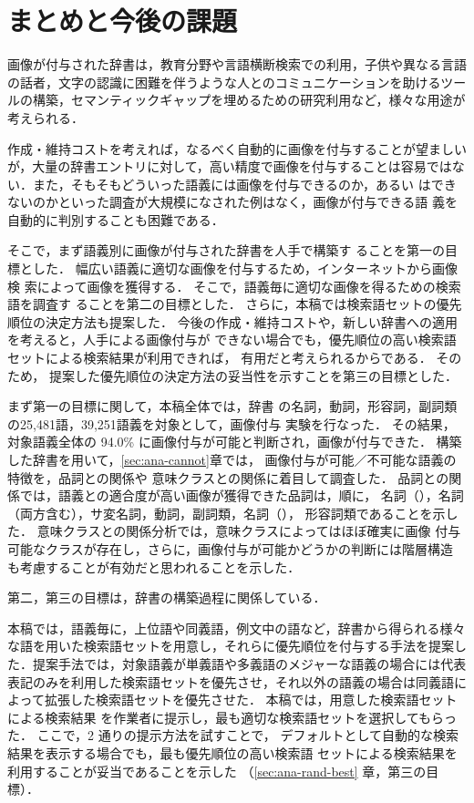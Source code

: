 \documentclass[japanese]{jnlp_1.4}
\newcommand{\izs}[1]{}
\newcommand{\lxd}{}
\begin{document}
\section{まとめと今後の課題}
\label{sec:conclusion}


画像が付与された辞書は，教育分野や言語横断検索での利用，子供や異なる言語
の話者，文字の認識に困難を伴うような人とのコミュニケーションを助けるツー
ルの構築，セマンティックギャップを埋めるための研究利用など，様々な用途が
考えられる．

作成・維持コストを考えれば，なるべく自動的に画像を付与することが望ましい
が，大量の辞書エントリに対して，高い精度で画像を付与することは容易ではな
い．また，そもそもどういった語義には画像を付与できるのか，あるい
はできないのかといった調査が大規模になされた例はなく，画像が付与できる語
義を自動的に判別することも困難である．


そこで，まず語義別に画像が付与された辞書を人手で構築す
ることを第一の目標とした．
幅広い語義に適切な画像を付与するため，インターネットから画像検
索によって画像を獲得する．
そこで，語義毎に適切な画像を得るための検索語を調査す
ることを第二の目標とした．
さらに，本稿では検索語セットの優先順位の決定方法も提案した．
今後の作成・維持コストや，新しい辞書への適用を考えると，人手による画像付与が
できない場合でも，優先順位の高い検索語セットによる検索結果が利用できれば，
有用だと考えられるからである．
そのため，
提案した優先順位の決定方法の妥当性を示すことを第三の目標とした．


まず第一の目標に関して，本稿全体では，辞書\lxd{}
の名詞，動詞，形容詞，副詞類の25,481語，39,251語義を対象として，画像付与
実験を行なった．
その結果，対象語義全体の 94.0\% に画像付与が可能と判断され，画像が付与できた．
構築した辞書を用いて，\ref{sec:ana-cannot}章では，
画像付与が可能／不可能な語義の特徴を，品詞との関係や
意味クラスとの関係に着目して調査した．
品詞との関係では，語義との適合度が高い画像が獲得できた品詞は，順に，
名詞（\izs{2:具体}），名詞（両方含む），サ変名詞，動詞，副詞類，名詞（\izs{1000:抽象}），
形容詞類であることを示した．
意味クラスとの関係分析では，意味クラスによってはほぼ確実に画像
付与可能なクラスが存在し，さらに，画像付与が可能かどうかの判断には階層構造
も考慮することが有効だと思われることを示した．

第二，第三の目標は，辞書の構築過程に関係している．

本稿では，語義毎に，上位語や同義語，例文中の語など，辞書から得られる様々
な語を用いた検索語セットを用意し，それらに優先順位を付与する手法を提案し
た．提案手法では，対象語義が単義語や多義語のメジャーな語義の場合には代表
表記のみを利用した検索語セットを優先させ，それ以外の語義の場合は同義語に
よって拡張した検索語セットを優先させた．
本稿では，用意した検索語セットによる検索結果
を作業者に提示し，最も適切な検索語セットを選択してもらった．
ここで，2 通りの提示方法を試すことで，
デフォルトとして自動的な検索結果を表示する場合でも，最も優先順位の高い検索語
セットによる検索結果を利用することが妥当であることを示した
（\ref{sec:ana-rand-best} 章，第三の目標）．
\end{document}
